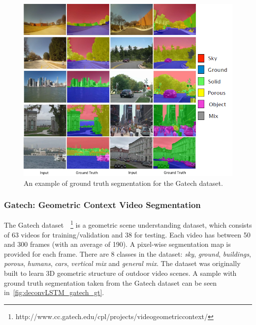 \begin{figure}[t!]
    \centering
    \includegraphics[width=\columnwidth]{img/deconvLSTM/gatech_gt.png}
    \caption{An example of ground truth segmentation for the Gatech dataset.}
    \label{fig:deconvLSTM_gatech_gt}
\end{figure}

\subsubsection{Gatech: Geometric Context Video Segmentation}
\label{sec:deconvLSTM_gatech}
The Gatech dataset~\citep{VideoGeometricContext2013}~\footnote{%
http://www.cc.gatech.edu/cpl/projects/videogeometriccontext/}
is a geometric scene understanding dataset, which consists of 63 videos for
training/validation and 38 for testing. Each video has between 50 and 300
frames (with an average of 190). A pixel-wise segmentation map is provided for
each frame. There are 8 classes in the dataset: \textit{sky}, \textit{ground},
\textit{buildings}, \textit{porous}, \textit{humans}, \textit{cars},
\textit{vertical mix} and \textit{general mix}. The dataset was originally built
to learn 3D geometric structure of outdoor video scenes. A sample with ground
truth segmentation taken from the Gatech dataset can be seen
in~\autoref{fig:deconvLSTM_gatech_gt}.

